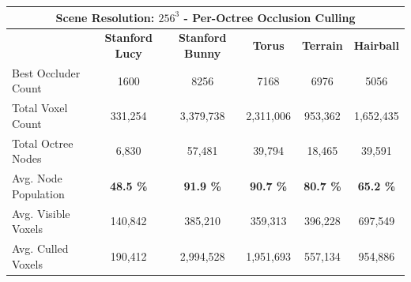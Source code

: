 \begin{table}[h]
  \label{tbl:culling-result-overview-pooc}
  \begin{tabular}{|lccccc|}
  \hline
  \multicolumn{6}{|c|}{\textbf{Scene Resolution: $256^3$ - Per-Octree Occlusion Culling}}                                                                                                                                                                                         \\ \hline
  \multicolumn{1}{|l|}{}                          & \multicolumn{1}{|c|}{\textbf{Stanford Lucy}}  & \multicolumn{1}{c|}{\textbf{Stanford Bunny}}  & \multicolumn{1}{c|}{\textbf{Torus}}   & \multicolumn{1}{c|}{\textbf{Terrain}}     & \multicolumn{1}{c|}{\textbf{Hairball}}    \\ \hline
  \multicolumn{1}{|l|}{Best Occluder Count}       & \multicolumn{1}{c|}{1600}                     & \multicolumn{1}{c|}{8256}                     & \multicolumn{1}{c|}{7168}             & \multicolumn{1}{c|}{6976}                 & \multicolumn{1}{c|}{5056}                 \\ 
  \multicolumn{1}{|l|}{Total Voxel Count}         & \multicolumn{1}{c|}{331,254}                  & \multicolumn{1}{c|}{3,379,738}                & \multicolumn{1}{c|}{2,311,006}        & \multicolumn{1}{c|}{953,362}              & \multicolumn{1}{c|}{1,652,435}            \\
  \multicolumn{1}{|l|}{Total Octree Nodes}        & \multicolumn{1}{c|}{6,830}                    & \multicolumn{1}{c|}{57,481}                   & \multicolumn{1}{c|}{39,794}           & \multicolumn{1}{c|}{18,465}               & \multicolumn{1}{c|}{39,591}               \\
  \multicolumn{1}{|l|}{Avg. Node Population}      & \multicolumn{1}{c|}{\textbf{48.5 \%}}         & \multicolumn{1}{c|}{\textbf{91.9 \%}}         & \multicolumn{1}{c|}{\textbf{90.7 \%}} & \multicolumn{1}{c|}{\textbf{80.7 \%}}     & \multicolumn{1}{c|}{\textbf{65.2 \%}}     \\ \hline
  \multicolumn{1}{|l|}{Avg. Visible Voxels}       & \multicolumn{1}{c|}{140,842}                  & \multicolumn{1}{c|}{385,210}                  & \multicolumn{1}{c|}{359,313}          & \multicolumn{1}{c|}{396,228}              & \multicolumn{1}{c|}{697,549}              \\
  \multicolumn{1}{|l|}{Avg. Culled Voxels}        & \multicolumn{1}{c|}{190,412}                  & \multicolumn{1}{c|}{2,994,528}                & \multicolumn{1}{c|}{1,951,693}        & \multicolumn{1}{c|}{557,134}              & \multicolumn{1}{c|}{954,886}              \\

\end{tabular}
\end{table}
